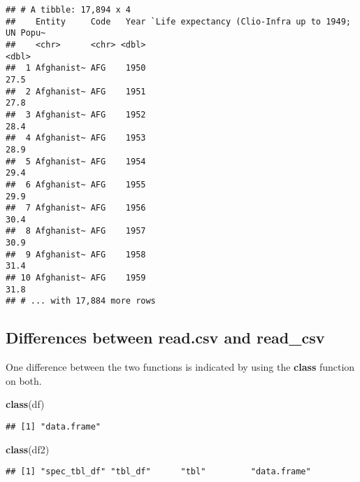 \documentclass[]{book}
\newenvironment{Shaded}{\begin{snugshade}}{\end{snugshade}}
\newcommand{\KeywordTok}[1]{\textcolor[rgb]{0.13,0.29,0.53}{\textbf{#1}}}
\newcommand{\NormalTok}[1]{#1}
\begin{document}
\begin{verbatim}
## # A tibble: 17,894 x 4
##    Entity     Code   Year `Life expectancy (Clio-Infra up to 1949; UN Popu~
##    <chr>      <chr> <dbl>                                             <dbl>
##  1 Afghanist~ AFG    1950                                              27.5
##  2 Afghanist~ AFG    1951                                              27.8
##  3 Afghanist~ AFG    1952                                              28.4
##  4 Afghanist~ AFG    1953                                              28.9
##  5 Afghanist~ AFG    1954                                              29.4
##  6 Afghanist~ AFG    1955                                              29.9
##  7 Afghanist~ AFG    1956                                              30.4
##  8 Afghanist~ AFG    1957                                              30.9
##  9 Afghanist~ AFG    1958                                              31.4
## 10 Afghanist~ AFG    1959                                              31.8
## # ... with 17,884 more rows
\end{verbatim}

\hypertarget{csvdiffs}{%
\subsection*{\texorpdfstring{Differences between \textbf{read.csv} and \textbf{read\_csv}}{Differences between read.csv and read\_csv}}\label{csvdiffs}}

One difference between the two functions is indicated by using the \textbf{class} function on both.

\begin{Shaded}
\begin{Highlighting}[]
\KeywordTok{class}\NormalTok{(df)}
\end{Highlighting}
\end{Shaded}

\begin{verbatim}
## [1] "data.frame"
\end{verbatim}

\begin{Shaded}
\begin{Highlighting}[]
\KeywordTok{class}\NormalTok{(df2)}
\end{Highlighting}
\end{Shaded}

\begin{verbatim}
## [1] "spec_tbl_df" "tbl_df"      "tbl"         "data.frame"
\end{verbatim}
\end{document}
